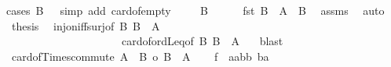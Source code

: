\begin{isabellebody}
{\isacharparenleft}{\kern0pt}cases\ {\isachardoublequoteopen}B\ {\isacharequal}{\kern0pt}\ {\isacharbraceleft}{\kern0pt}{\isacharbraceright}{\kern0pt}{\isachardoublequoteclose}{\isacharcomma}{\kern0pt}\ simp\ add{\isacharcolon}{\kern0pt}\ card{\isacharunderscore}{\kern0pt}of{\isacharunderscore}{\kern0pt}empty{\isacharparenright}{\kern0pt}\isanewline
\ \ \isamarkupfalse%
\ {\isacharasterisk}{\kern0pt}{\isacharcolon}{\kern0pt}\ {\isachardoublequoteopen}B\ {\isasymnoteq}\ {\isacharbraceleft}{\kern0pt}{\isacharbraceright}{\kern0pt}{\isachardoublequoteclose}\isanewline
\ \ \isamarkupfalse%
\ {\isachardoublequoteopen}fst\ {\isacharbackquote}{\kern0pt}{\isacharparenleft}{\kern0pt}B\ {\isasymtimes}\ A{\isacharparenright}{\kern0pt}\ {\isacharequal}{\kern0pt}\ B{\isachardoublequoteclose}\ \isamarkupfalse%
\ assms\ \isamarkupfalse%
\ auto\isanewline
\ \ \isamarkupfalse%
\ {\isacharquery}{\kern0pt}thesis\ \isamarkupfalse%
\ inj{\isacharunderscore}{\kern0pt}on{\isacharunderscore}{\kern0pt}iff{\isacharunderscore}{\kern0pt}surj{\isacharbrackleft}{\kern0pt}of\ B\ {\isachardoublequoteopen}B\ {\isasymtimes}\ A{\isachardoublequoteclose}{\isacharbrackright}{\kern0pt}\isanewline
\ \ \ \ \ \ \ \ \ \ \ \ \ \ \ \ \ \ \ \ \ card{\isacharunderscore}{\kern0pt}of{\isacharunderscore}{\kern0pt}ordLeq{\isacharbrackleft}{\kern0pt}of\ B\ {\isachardoublequoteopen}B\ {\isasymtimes}\ A{\isachardoublequoteclose}{\isacharbrackright}{\kern0pt}\ {\isacharasterisk}{\kern0pt}\ \isamarkupfalse%
\ blast\isanewline
{}\isamarkupfalse%
%
\endisatagproof
{\isafoldproof}%
%
\isadelimproof
\isanewline
%
\endisadelimproof
\isanewline
{}\isamarkupfalse%
\ card{\isacharunderscore}{\kern0pt}of{\isacharunderscore}{\kern0pt}Times{\isacharunderscore}{\kern0pt}commute{\isacharcolon}{\kern0pt}\ {\isachardoublequoteopen}{\isacharbar}{\kern0pt}A\ {\isasymtimes}\ B{\isacharbar}{\kern0pt}\ {\isacharequal}{\kern0pt}o\ {\isacharbar}{\kern0pt}B\ {\isasymtimes}\ A{\isacharbar}{\kern0pt}{\isachardoublequoteclose}\isanewline
%
\isadelimproof
%
\endisadelimproof
%
\isatagproof
{}\isamarkupfalse%
{\isacharminus}{\kern0pt}\isanewline
\ \ \isamarkupfalse%
\ {\isacharquery}{\kern0pt}f\ {\isacharequal}{\kern0pt}\ {\isachardoublequoteopen}{\isasymlambda}{\isacharparenleft}{\kern0pt}a{\isacharcolon}{\kern0pt}{\isacharcolon}{\kern0pt}{\isacharprime}{\kern0pt}a{\isacharcomma}{\kern0pt}b{\isacharcolon}{\kern0pt}{\isacharcolon}{\kern0pt}{\isacharprime}{\kern0pt}b{\isacharparenright}{\kern0pt}{\isachardot}{\kern0pt}\ {\isacharparenleft}{\kern0pt}b{\isacharcomma}{\kern0pt}a{\isacharparenright}{\kern0pt}{\isachardoublequoteclose}\isanewline

\end{isabellebody}
